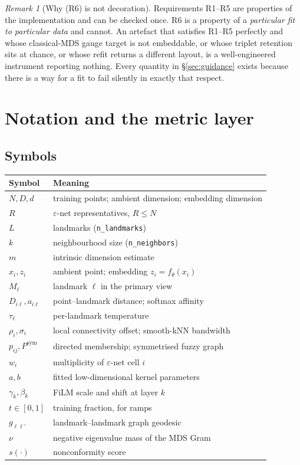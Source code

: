 \documentclass[12pt]{iopart}
\theoremstyle{definition}
\theoremstyle{plain}
\theoremstyle{remark}
\newtheorem{remark}{Remark}
\newcommand{\code}[1]{\texttt{#1}}
\begin{document}
\begin{remark}[Why (R6) is not decoration]
Requirements R1--R5 are properties of the implementation and can be checked
once. R6 is a property of a \emph{particular fit to particular data} and cannot.
An artefact that satisfies R1--R5 perfectly and whose classical-MDS gauge target
is not embeddable, or whose triplet retention sits at chance, or whose refit
returns a different layout, is a well-engineered instrument reporting nothing.
Every quantity in \S\ref{sec:guidance} exists because there is a way for a fit
to fail silently in exactly that respect.
\end{remark}

\section{Notation and the metric layer}
\label{sec:metric}

\subsection{Symbols}

\begin{center}
\small
\begin{tabular}{ll}
\toprule
Symbol & Meaning \\
\midrule
$N,D,d$ & training points; ambient dimension; embedding dimension \\
$R$ & $\varepsilon$-net representatives, $R\le N$ \\
$L$ & landmarks (\code{n\_landmarks}) \\
$k$ & neighbourhood size (\code{n\_neighbors}) \\
$m$ & intrinsic dimension estimate \\
$x_i,z_i$ & ambient point; embedding $z_i=f_\theta(x_i)$ \\
$M_\ell$ & landmark $\ell$ in the primary view \\
$D_{i\ell},a_{i\ell}$ & point--landmark distance; softmax affinity \\
$\tau_\ell$ & per-landmark temperature \\
$\rho_i,\sigma_i$ & local connectivity offset; smooth-kNN bandwidth \\
$p_{ij},P^{\mathrm{sym}}$ & directed membership; symmetrised fuzzy graph \\
$w_i$ & multiplicity of $\varepsilon$-net cell $i$ \\
$a,b$ & fitted low-dimensional kernel parameters \\
$\gamma_k,\beta_k$ & FiLM scale and shift at layer $k$ \\
$t\in[0,1]$ & training fraction, for ramps \\
$g_{\ell\ell'}$ & landmark--landmark graph geodesic \\
$\nu$ & negative eigenvalue mass of the MDS Gram \\
$s(\cdot)$ & nonconformity score \\
\bottomrule
\end{tabular}
\end{center}
\end{document}
